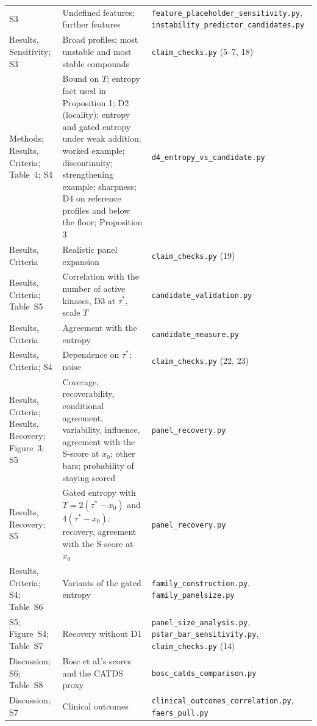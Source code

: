 \documentclass[11pt]{article}
\begin{document}
\begin{longtable}{>{\raggedright\arraybackslash}p{}>{\raggedright\arraybackslash}p{}>{\raggedright\arraybackslash}p{}}
S3 & Undefined features; further features & \texttt{feature\_\allowbreak{}placeholder\_\allowbreak{}sensitivity.py}, \texttt{instability\_\allowbreak{}predictor\_\allowbreak{}candidates.py} \\
Results, Sensitivity; S3 & Broad profiles; most unstable and most stable compounds & \texttt{claim\_\allowbreak{}checks.py} (5--7, 18) \\
Methods; Results, Criteria; Table~4; S4 & Bound on $T$; entropy fact used in Proposition 1; D2 (locality); entropy and gated entropy under weak addition; worked example; discontinuity; strengthening example; sharpness; D4 on reference profiles and below the floor; Proposition 3 & \texttt{d4\_\allowbreak{}entropy\_\allowbreak{}vs\_\allowbreak{}candidate.py} \\
Results, Criteria & Realistic panel expansion & \texttt{claim\_\allowbreak{}checks.py} (19) \\
Results, Criteria; Table~S5 & Correlation with the number of active kinases, D3 at $\tau^*$, scale $T$ & \texttt{candidate\_\allowbreak{}validation.py} \\
Results, Criteria & Agreement with the entropy & \texttt{candidate\_\allowbreak{}measure.py} \\
Results, Criteria; S4 & Dependence on $\tau^*$; noise & \texttt{claim\_\allowbreak{}checks.py} (22, 23) \\
Results, Criteria; Results, Recovery; Figure~3; S5 & Coverage, recoverability, conditional agreement, variability, influence, agreement with the S-score at $x_0$; other bars; probability of staying scored & \texttt{panel\_\allowbreak{}recovery.py} \\
Results, Recovery; S5 & Gated entropy with $T = 2(\tau^* - x_0)$ and $4(\tau^* - x_0)$: recovery, agreement with the S-score at $x_0$ & \texttt{panel\_\allowbreak{}recovery.py} \\
Results, Criteria; S4; Table~S6 & Variants of the gated entropy & \texttt{family\_\allowbreak{}construction.py}, \texttt{family\_\allowbreak{}panelsize.py} \\
S5; Figure~S4; Table~S7 & Recovery without D1 & \texttt{panel\_\allowbreak{}size\_\allowbreak{}analysis.py}, \texttt{pstar\_\allowbreak{}bar\_\allowbreak{}sensitivity.py}, \texttt{claim\_\allowbreak{}checks.py} (14) \\
Discussion; S6; Table~S8 & Bosc et al.'s scores and the CATDS proxy & \texttt{bosc\_\allowbreak{}catds\_\allowbreak{}comparison.py} \\
Discussion; S7 & Clinical outcomes & \texttt{clinical\_\allowbreak{}outcomes\_\allowbreak{}correlation.py}, \texttt{faers\_\allowbreak{}pull.py} \\
\end{longtable}
\normalsize


\end{document}
